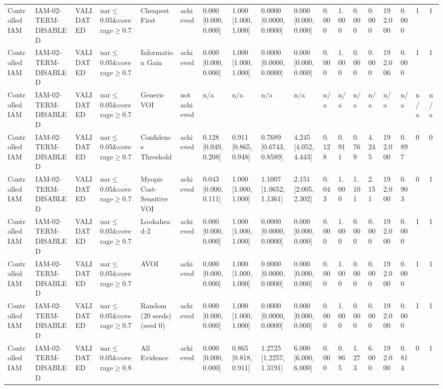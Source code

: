 \begin{table}[!ht]
{\begin{tabular}{llllllllllllllllll}
Controlled IAM & IAM-02-TERM-DISABLED & VALIDATED & uar$\le$0.05\&coverage$\ge$0.7 & Cheapest First & achieved & 0.000 [0.000, 0.000] & 1.000 [1.000, 1.000] & 0.0000 [0.0000, 0.0000] & 0.000 [0.000, 0.000] & 0.000 & 1.000 & 0.000 & 0.000 & 192.000 & 0.000 & 1 & 1 \\
Controlled IAM & IAM-02-TERM-DISABLED & VALIDATED & uar$\le$0.05\&coverage$\ge$0.7 & Information Gain & achieved & 0.000 [0.000, 0.000] & 1.000 [1.000, 1.000] & 0.0000 [0.0000, 0.0000] & 0.000 [0.000, 0.000] & 0.000 & 1.000 & 0.000 & 0.000 & 192.000 & 0.000 & 1 & 1 \\
Controlled IAM & IAM-02-TERM-DISABLED & VALIDATED & uar$\le$0.05\&coverage$\ge$0.7 & Generic VOI & not achieved & n/a & n/a & n/a & n/a & n/a & n/a & n/a & n/a & n/a & n/a & n/a & n/a \\
Controlled IAM & IAM-02-TERM-DISABLED & VALIDATED & uar$\le$0.05\&coverage$\ge$0.7 & Confidence Threshold & achieved & 0.128 [0.049, 0.208] & 0.911 [0.865, 0.948] & 0.7689 [0.6743, 0.8589] & 4.245 [4.052, 4.443] & 0.128 & 0.911 & 0.769 & 4.245 & 192.000 & 0.897 & 0 & 0 \\
Controlled IAM & IAM-02-TERM-DISABLED & VALIDATED & uar$\le$0.05\&coverage$\ge$0.7 & Myopic Cost-Sensitive VOI & achieved & 0.043 [0.000, 0.111] & 1.000 [1.000, 1.000] & 1.1007 [1.0652, 1.1361] & 2.151 [2.005, 2.302] & 0.043 & 1.000 & 1.101 & 2.151 & 192.000 & 0.903 & 0 & 1 \\
Controlled IAM & IAM-02-TERM-DISABLED & VALIDATED & uar$\le$0.05\&coverage$\ge$0.7 & Lookahead-2 & achieved & 0.000 [0.000, 0.000] & 1.000 [1.000, 1.000] & 0.0000 [0.0000, 0.0000] & 0.000 [0.000, 0.000] & 0.000 & 1.000 & 0.000 & 0.000 & 192.000 & 0.000 & 1 & 1 \\
Controlled IAM & IAM-02-TERM-DISABLED & VALIDATED & uar$\le$0.05\&coverage$\ge$0.7 & AVOI & achieved & 0.000 [0.000, 0.000] & 1.000 [1.000, 1.000] & 0.0000 [0.0000, 0.0000] & 0.000 [0.000, 0.000] & 0.000 & 1.000 & 0.000 & 0.000 & 192.000 & 0.000 & 1 & 1 \\
Controlled IAM & IAM-02-TERM-DISABLED & VALIDATED & uar$\le$0.05\&coverage$\ge$0.7 & Random (20 seeds) (seed 0) & achieved & 0.000 [0.000, 0.000] & 1.000 [1.000, 1.000] & 0.0000 [0.0000, 0.0000] & 0.000 [0.000, 0.000] & 0.000 & 1.000 & 0.000 & 0.000 & 192.000 & 0.000 & 1 & 1 \\
Controlled IAM & IAM-02-TERM-DISABLED & VALIDATED & uar$\le$0.05\&coverage$\ge$0.8 & All Evidence & achieved & 0.000 [0.000, 0.000] & 0.865 [0.818, 0.911] & 1.2725 [1.2257, 1.3191] & 6.000 [6.000, 6.000] & 0.000 & 0.865 & 1.273 & 6.000 & 192.000 & 0.814 & 0 & 1 \\

\end{tabular}}
\end{table}
